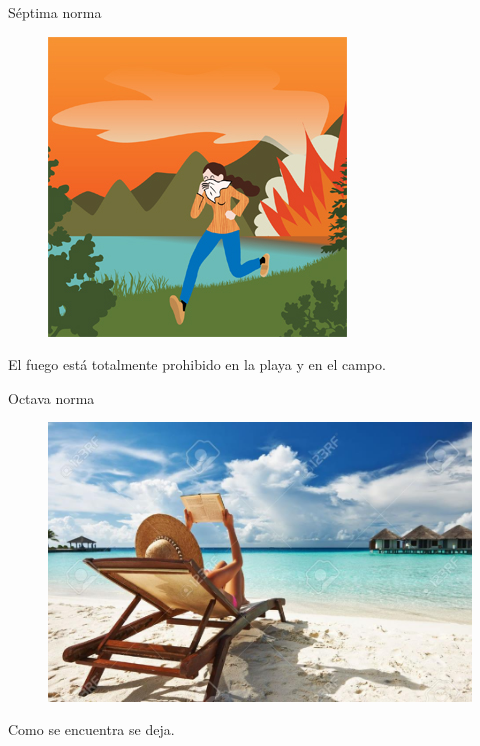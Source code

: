 \documentclass{beamer}
\begin{document}
\begin{frame}{Séptima norma}
\begin{figure}
\includegraphics[scale=.55]{Images/NORMA7.jpg} 
\end{figure}
El fuego está totalmente prohibido en la playa y en el campo.
\end{frame}
 \begin{frame}{Octava norma}
 \begin{figure}
 \includegraphics[scale=.25]{Images/NORMA8.png} 
 \end{figure}
 \begin{center}
 Como se encuentra se deja.
 \end{center}
 \end{frame}
\end{document}
